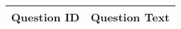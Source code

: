 \begin{table}[!h]
\footnotesize
{}
{
\setlength{\extrarowheight}{5pt}

\begin{tabular}{ll}
\hline\hline
\multicolumn{1}{c}{\bf Question ID}&\multicolumn{1}{c}{\bf Question Text}\tabularnewline
\hline
%
%

\end{tabular}}
\end{table}
